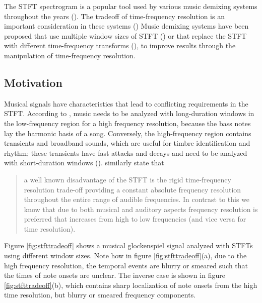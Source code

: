 \documentclass[report.tex]{subfiles}
\begin{document}
The STFT spectrogram is a popular tool used by various music demixing systems throughout the years (\cite{musicsepgood, musicsepsurvey, sisec2018, fitzgerald1, umx, plumbley1, plumbley2}). The tradeoff of time-frequency resolution is an important consideration in these systems (\cite{tftradeoff1, tftradeoff2}) Music demixing systems have been proposed that use multiple window sizes of STFT (\cite{fitzgerald2, driedger}) or that replace the STFT with different time-frequency transforms (\cite{fitzgerald2, cqtseparation, bettermusicsep}), to improve results through the manipulation of time-frequency resolution.

\subsection{Motivation}
\label{sec:motivation}

Musical signals have characteristics that lead to conflicting requirements in the STFT. According to \textcite{doerflerphd}, music needs to be analyzed with long-duration windows in the low-frequency region for a high frequency resolution, because the bass notes lay the harmonic basis of a song. Conversely, the high-frequency region contains transients and broadband sounds, which are useful for timbre identification and rhythm; these transients have fast attacks and decays and need to be analyzed with short-duration windows (\cite{doerflerphd}). \textcite[1]{cqtransient} similarly state that

\begin{quote}
	a well known disadvantage of the STFT is the rigid time-frequency resolution trade-off providing a constant absolute frequency resolution throughout the entire range of audible frequencies. In contrast to this we know that due to both musical and auditory aspects frequency resolution is preferred that increases from high to low frequencies (and vice versa for time resolution).
\end{quote}

Figure \ref{fig:stfttradeoff} shows a musical glockenspiel signal analyzed with STFTs using different window sizes. Note how in figure \ref{fig:stfttradeoff}(a), due to the high frequency resolution, the temporal events are blurry or smeared such that the times of note onsets are unclear. The inverse case is shown in figure \ref{fig:stfttradeoff}(b), which contains sharp localization of note onsets from the high time resolution, but blurry or smeared frequency components.
\end{document}
